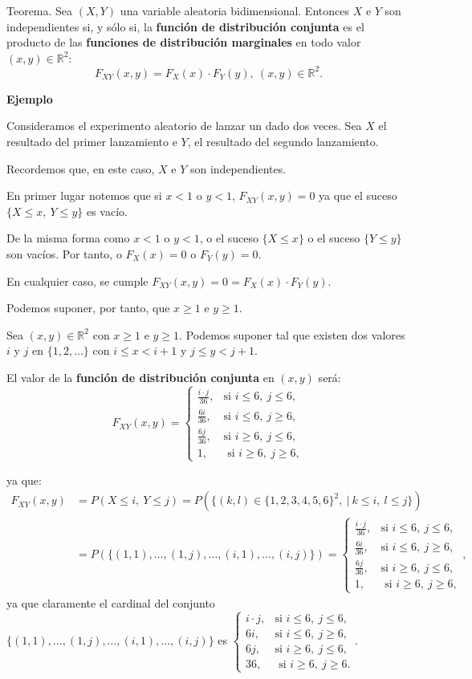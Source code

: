 \documentclass[]{book}
\begin{document}
Teorema.
Sea \((X,Y)\) una variable aleatoria bidimensional. Entonces
\(X\) e \(Y\) son independientes si, y sólo si, la \textbf{función de distribución conjunta} es el producto de las \textbf{funciones de distribución marginales} en todo valor \((x,y)\in\mathbb{R}^2\):
\[
F_{XY}(x,y)=F_X(x)\cdot F_Y(y),\ (x,y)\in\mathbb{R}^2.
\]

\textbf{Ejemplo}

Consideramos el experimento aleatorio de lanzar un dado dos veces. Sea \(X\) el resultado del primer lanzamiento e \(Y\), el resultado del segundo lanzamiento.

Recordemos que, en este caso, \(X\) e \(Y\) son independientes.

En primer lugar notemos que si \(x<1\) o \(y<1\), \(F_{XY}(x,y)=0\) ya que el suceso \(\{X\leq x,\ Y\leq y\}\) es vacío.

De la misma forma como \(x<1\) o \(y<1\), o el suceso \(\{X\leq x\}\) o el suceso \(\{Y\leq y\}\) son vacíos. Por tanto, o \(F_X(x)=0\) o \(F_Y(y)=0\).

En cualquier caso, se cumple \(F_{XY}(x,y)=0=F_X(x)\cdot F_Y(y)\).

Podemos suponer, por tanto, que \(x\geq 1\) e \(y\geq 1\).

Sea \((x,y)\in \mathbb{R}^2\) con \(x\geq 1\) e \(y\geq 1\). Podemos suponer tal que existen dos valores \(i\) y \(j\) en \(\{1,2,\ldots\}\) con \(i\leq x < i+1\) y \(j\leq y <j+1\).

El valor de la \textbf{función de distribución conjunta} en \((x,y)\) será:
\[
F_{XY}(x,y)=\begin{cases}
\frac{i\cdot j}{36}, & \mbox{si }i\leq 6, \ j\leq 6, \\
\frac{6 i}{36}, & \mbox{si }i\leq 6,\ j\geq 6,\\
\frac{6 j}{36}, & \mbox{si }i\geq 6,\ j\leq 6,\\
1, & \mbox{ si }i\geq 6,\ j\geq 6,
\end{cases}
\]

ya que:
\[
\begin{array}{rl}
F_{XY}(x,y) & =P(X\leq i,\ Y\leq j)=P(\{(k,l)\in \{1,2,3,4,5,6\}^2,\ |\ k\leq i,\ l\leq j\})\\ & =P(\{(1,1),\ldots,(1,j),\ldots,(i,1),\ldots,(i,j)\})=\begin{cases}
\frac{i\cdot j}{36}, & \mbox{si }i\leq 6, \ j\leq 6, \\
\frac{6 i}{36}, & \mbox{si }i\leq 6,\ j\geq 6,\\
\frac{6 j}{36}, & \mbox{si }i\geq 6,\ j\leq 6,\\
1, & \mbox{ si }i\geq 6,\ j\geq 6,
\end{cases},
\end{array}
\]
ya que claramente el cardinal del conjunto \(\{(1,1),\ldots,(1,j),\ldots,(i,1),\ldots,(i,j)\}\) es \(\begin{cases} i\cdot j, & \mbox{si }i\leq 6, \ j\leq 6, \\ 6 i, & \mbox{si }i\leq 6,\ j\geq 6,\\ 6 j, & \mbox{si }i\geq 6,\ j\leq 6,\\ 36, & \mbox{ si }i\geq 6,\ j\geq 6. \end{cases}\).
\end{document}
